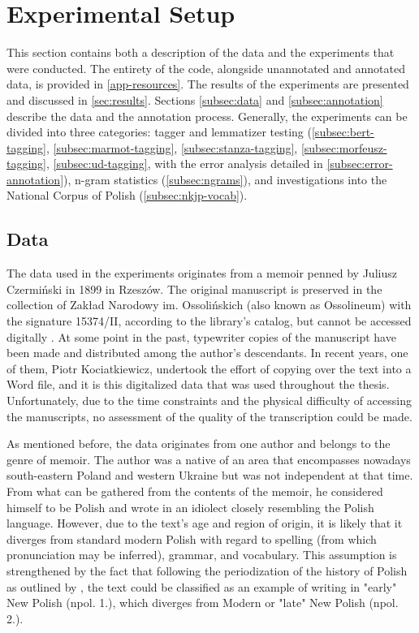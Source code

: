 \section{Experimental Setup}
\label{sec:exp-setup}

This section contains both a description of the data and the experiments that were conducted. The entirety of the code, alongside unannotated and annotated data, is provided in \autoref{app-resources}. The results of the experiments are presented and discussed in \autoref{sec:results}. Sections \autoref{subsec:data} and \autoref{subsec:annotation} describe the data and the annotation process. Generally, the experiments can be divided into three categories: tagger and lemmatizer testing (\autoref{subsec:bert-tagging}, \autoref{subsec:marmot-tagging}, \autoref{subsec:stanza-tagging}, \autoref{subsec:morfeusz-tagging}, \autoref{subsec:ud-tagging}, with the error analysis detailed in \autoref{subsec:error-annotation}), n-gram statistics (\autoref{subsec:ngrams}), and investigations into the National Corpus of Polish (\autoref{subsec:nkjp-vocab}). 

\subsection{Data}
\label{subsec:data}

The data used in the experiments originates from a memoir penned by Juliusz Czermiński in 1899 in Rzeszów. The original manuscript is preserved in the collection of Zakład Narodowy im. Ossolińskich (also known as Ossolineum) with the signature 15374/II, according to the library's catalog, but cannot be accessed digitally \citep{ossolineum}. At some point in the past, typewriter copies of the manuscript have been made and distributed among the author's descendants. In recent years, one of them, Piotr Kociat\-kiewicz, undertook the effort of copying over the text into a Word file, and it is this digitalized data that was used throughout the thesis. Unfortunately, due to the time constraints and the physical difficulty of accessing the manuscripts, no assessment of the quality of the transcription could be made.

As mentioned before, the data originates from one author and belongs to the genre of memoir. The author was a native of an area that encompasses nowadays south-eastern Poland and western Ukraine but was not independent at that time. From what can be gathered from the contents of the memoir, he considered himself to be Polish and wrote in an idiolect closely resembling the Polish language. However, due to the text's age and region of origin, it is likely that it diverges from standard modern Polish with regard to spelling (from which pronunciation may be inferred), grammar, and vocabulary. This assumption is strengthened by the fact that following the periodization of the history of Polish as outlined by \citet{długosz-kurczabowa_dubisz_2006}, the text could be classified as an example of writing in "early" New Polish (npol. 1.), which diverges from Modern or "late" New Polish (npol. 2.).

